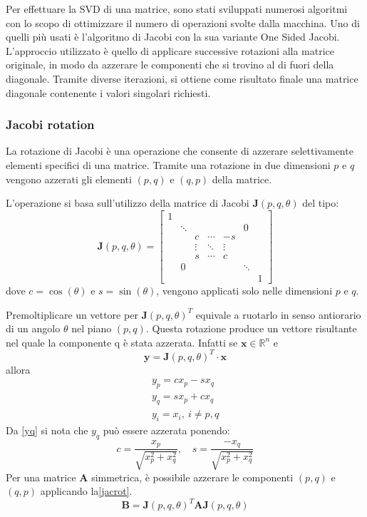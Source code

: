 \label{sec:OneSidedJacobi}
Per effettuare la SVD di una matrice, sono stati sviluppati numerosi algoritmi con lo scopo di ottimizzare il numero di operazioni svolte dalla macchina.
Uno di quelli più usati è l'algoritmo di Jacobi con la sua variante One Sided Jacobi. L'approccio utilizzato è quello di applicare successive rotazioni alla matrice originale, in modo da azzerare le componenti che si trovino al di fuori della diagonale. Tramite diverse iterazioni, si ottiene come risultato finale una matrice diagonale contenente i valori singolari richiesti.
\subsubsection{Jacobi rotation}
\label{sec:Jacobi_rotation}
La rotazione di Jacobi è una operazione che consente di azzerare selettivamente elementi specifici di una matrice. Tramite una rotazione in due dimensioni $p$ e $q$ vengono azzerati gli elementi $(p,q)$ e $(q,p)$ della matrice.

L'operazione si basa sull'utilizzo della matrice di Jacobi $\mathbf{J}(p,q,\theta)$ del tipo:
\begin{equation}
\mathbf{J}(p,q,\theta)=\begin{bmatrix}
1 &  &  &  &  &  & \\
& \ddots &  &  &  & 0 & \\
&  & c & \cdots & -s &  & \\
&  & \vdots & \ddots & \vdots &  & \\
&  & s & \cdots & c &  & \\
& 0 &  &  &  & \ddots & \\
&  &  &  &  &  & 1
\end{bmatrix}
\end{equation}
dove $c=\cos(\theta)$ e $s=\sin(\theta)$, vengono applicati solo nelle dimensioni $p$ e $q$.

Premoltiplicare un vettore per $\mathbf{J}(p,q,\theta)^T$ equivale a ruotarlo in senso antiorario di un angolo $\theta$ nel piano $(p,q)$. Questa rotazione produce un vettore risultante nel quale la componente q è stata azzerata. Infatti se $\mathbf{x}\in\mathbb{R}^{n}$ e
\begin{equation}
\mathbf{y}=\mathbf{J}(p,q,\theta)^T	\cdot \mathbf{x}
\end{equation}
allora
\begin{eqnarray}
y_p=cx_p-sx_q\\
y_q=sx_p+cx_q\label{yq}\\
y_i=x_i, ~ i\neq p,q
\end{eqnarray}
Da \eqref{yq} si nota che $y_q$ può essere azzerata ponendo:
\begin{equation}
c=\frac{x_p}{\sqrt{x_p^2+x_q^2}},\quad s=\frac{-x_q}{\sqrt{x_p^2+x_q^2}}
\end{equation}
Per una matrice $\mathbf{A}$ simmetrica, è possibile azzerare le componenti $(p,q)$ e $(q,p)$ applicando la\eqref{jacrot}.
\begin{equation}\label{jacrot}
\mathbf{B}=\mathbf{J}(p,q,\theta)^T\mathbf{A}\mathbf{J}(p,q,\theta)
\end{equation}

